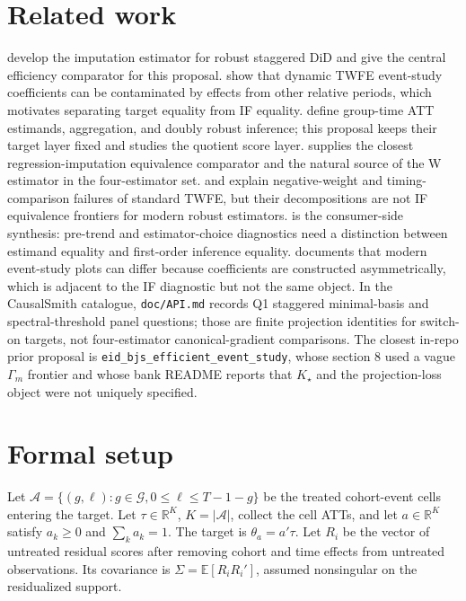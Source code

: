 \documentclass[11pt]{article}
\newcommand{\E}{\mathbb{E}}
\theoremstyle{definition}
\theoremstyle{plain}
\theoremstyle{remark}
\begin{document}
\section{Related work}
\citet{borusyak_jaravel_spiess_2024_restud} develop the imputation estimator for robust staggered DiD and give the central efficiency comparator for this proposal. \citet{sun_abraham_2021_joe} show that dynamic TWFE event-study coefficients can be contaminated by effects from other relative periods, which motivates separating target equality from IF equality. \citet{callaway_santanna_2021_joe} define group-time ATT estimands, aggregation, and doubly robust inference; this proposal keeps their target layer fixed and studies the quotient score layer. \citet{wooldridge_2023_ectj} supplies the closest regression-imputation equivalence comparator and the natural source of the W estimator in the four-estimator set. \citet{dechaisemartin_dhaultfoeuille_2020_aer} and \citet{goodman_bacon_2021_joe} explain negative-weight and timing-comparison failures of standard TWFE, but their decompositions are not IF equivalence frontiers for modern robust estimators. \citet{roth_santanna_bilinski_poe_2023_joe} is the consumer-side synthesis: pre-trend and estimator-choice diagnostics need a distinction between estimand equality and first-order inference equality. \citet{roth_2026_eventstudy_note} documents that modern event-study plots can differ because coefficients are constructed asymmetrically, which is adjacent to the IF diagnostic but not the same object. In the CausalSmith catalogue, \texttt{doc/API.md} records Q1 staggered minimal-basis and spectral-threshold panel questions; those are finite projection identities for switch-on targets, not four-estimator canonical-gradient comparisons. The closest in-repo prior proposal is \texttt{eid\_bjs\_efficient\_event\_study}, whose section 8 used a vague \(\Gamma_m\) frontier and whose bank README reports that \(K_\star\) and the projection-loss object were not uniquely specified.

\section{Formal setup}
Let \(\mathcal A=\{(g,\ell):g\in\mathcal G,0\le \ell\le T-1-g\}\) be the treated cohort-event cells entering the target. Let \(\tau\in\mathbb R^{K}\), \(K=|\mathcal A|\), collect the cell ATTs, and let \(a\in\mathbb R^K\) satisfy \(a_k\ge0\) and \(\sum_k a_k=1\). The target is \(\theta_a=a'\tau\). Let \(R_i\) be the vector of untreated residual scores after removing cohort and time effects from untreated observations. Its covariance is \(\Sigma=\E[R_iR_i']\), assumed nonsingular on the residualized support.
\end{document}
